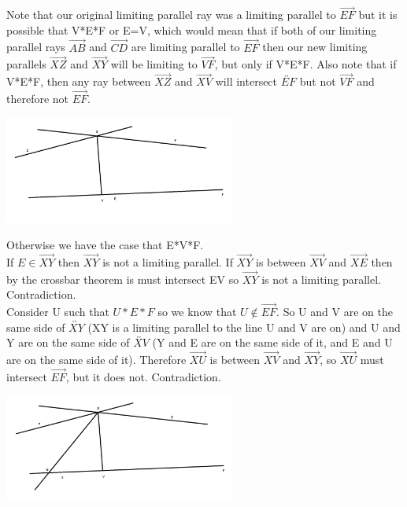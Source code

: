 \documentclass[12pt,letterpaper]{article}
\begin{document}
Note that our original limiting parallel ray was a limiting parallel to $\overrightarrow{EF}$ but it is possible that V*E*F or E=V, which would mean that if both of our limiting parallel rays $\overrightarrow{AB}$ and $\overrightarrow{CD}$ are limiting parallel to $\overrightarrow{EF}$ then our new limiting parallels $\overrightarrow{XZ}$ and $\overrightarrow{XY}$ will be limiting to $\overrightarrow{VF}$, but only if V*E*F.  Also note that if V*E*F, then any ray between $\overrightarrow{XZ}$ and $\overrightarrow{XV}$ will intersect $\overleftrightarrow{EF}$ but not $\overrightarrow{VF}$ and therefore not $\overrightarrow{EF}$.\\

\begin{center}
\includegraphics[width=3in]{limitingparallel1.png}
\end{center}

Otherwise we have the case that E*V*F.\\
If $E\in \overrightarrow{XY}$ then $\overrightarrow{XY}$ is not a limiting parallel.  If $\overrightarrow{XY}$ is between $\overrightarrow{XV}$ and $\overrightarrow{XE}$ then by the crossbar theorem is must intersect EV so $\overrightarrow{XY}$ is not a limiting parallel.  Contradiction.\\



Consider U such that $U*E*F$ so we know that $U\not \in \overrightarrow{EF}$.  So U and V are on the same side of $\overleftrightarrow{XY}$ (XY is a limiting parallel to the line U and V are on) and U and Y are on the same side of $\overleftrightarrow{XV}$ (Y and E are on the same side of it, and E and U are on the same side of it).  Therefore $\overrightarrow{XU}$ is between $\overrightarrow{XV}$ and $\overrightarrow{XY}$, so $\overrightarrow{XU}$ must intersect $\overrightarrow{EF}$, but it does not.  Contradiction.  

\begin{center}
\includegraphics[width=3in]{limitingparallel2.png}
\end{center}
\end{document}
